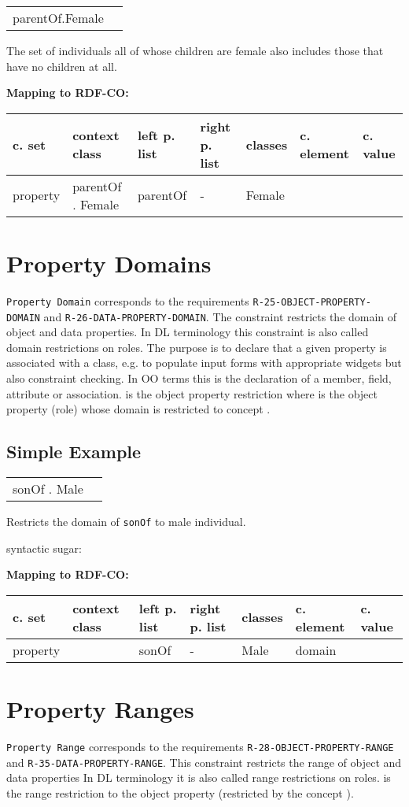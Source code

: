 \documentclass{llncs}
\newcommand{\ms}[1]{\texttt{#1}}
\newenvironment{gcotable}{
  \scriptsize
  \sffamily
  \vspace{0cm}
	\begin{center}
	\textbf{\vspace{0.4cm}Mapping to RDF-CO:} \\
  \begin{tabular}{l|l|l|l|l|l|l}
	\hline
  \textbf{c. set} & \textbf{context class} & \textbf{left p. list} & \textbf{right p. list} & \textbf{classes} & \textbf{c. element} & \textbf{c. value} \\
  \hline

}{
  \hline
  \end{tabular}
	\end{center}
}
\newenvironment{DL}{
\vspace{0cm}
	\begin{center}
  \begin{tabular}{r l}

}{
  \end{tabular}
	\end{center}
}
\begin{document}
\begin{DL}
 parentOf.Female
\end{DL}

The set of individuals all of whose children are female also includes those that have no children at all.

\begin{gcotable}
property &  parentOf . Female & parentOf & - & Female &  \\
\end{gcotable}

\section{Property Domains}

\ms{Property Domain} corresponds to the requirements \ms{R-25-OBJECT-PROPERTY-DOMAIN} and \ms{R-26-DATA-PROPERTY-DOMAIN}.
The constraint restricts the domain of object and data properties.
In DL terminology this constraint is also called domain restrictions on roles.
The purpose is to declare that a given property is associated with a class, e.g. to populate input forms with appropriate widgets but also constraint checking. In OO terms this is the declaration of a member, field, attribute or association. 
 is the object property restriction where  is the object property (role) whose domain is restricted to concept .

\subsection{Simple Example}

\begin{DL}
 sonOf .   Male 
\end{DL}

Restricts the domain of \ms{sonOf} to male individual.

syntactic sugar:

\begin{gcotable}
property &  & sonOf & - & Male & domain \\
\end{gcotable}

\section{Property Ranges}

\ms{Property Range} corresponds to the requirements \ms{R-28-OBJECT-PROPERTY-RANGE} and \ms{R-35-DATA-PROPERTY-RANGE}.
This constraint restricts the range of object and data properties
In DL terminology it is also called range restrictions on roles.
 is the range restriction to the object property  (restricted by the concept ).  
\end{document}
